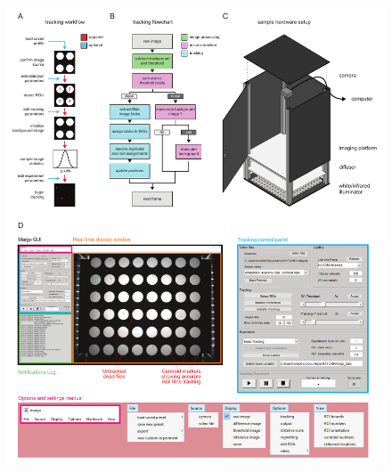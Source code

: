 \documentclass[10pt,letterpaper]{article}
\begin{document}
\nolinenumbers

 

\clearpage

\linenumbers

\begin{figure}
\includegraphics[width=0.95\linewidth]{../../figures/autotracker_overview.pdf}
\end{figure}
\end{document}
